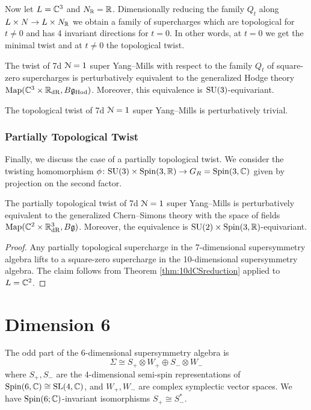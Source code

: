 \documentclass[10pt, oneside]{article}
\begin{document}
Now let $L=\mathbb C^3$ and $N_\mathbb R=\mathbb R$. Dimensionally reducing the family $Q_t$ along $L\times N\rightarrow L\times N_\mathbb R$ we obtain a family of supercharges which are topological for $t\neq 0$ and has 4 invariant directions for $t=0$. In other words, at $t=0$ we get the minimal twist and at $t\neq 0$ the topological twist.

\begin{theorem}
The twist of 7d $\mathcal N=1$ super Yang--Mills with respect to the family $Q_t$ of square-zero supercharges is perturbatively equivalent to the generalized Hodge theory $\operatorname{Map}(\mathbb C^3\times \mathbb R_{\mathrm{dR}}, B\mathfrak g_{\mathrm{Hod}})$. Moreover, this equivalence is $\mathrm{SU}(3)$-equivariant.
\label{thm:7dHodgetwist}
\end{theorem}

\begin{corollary}
The topological twist of 7d $\mathcal N=1$ super Yang--Mills is perturbatively trivial.
\end{corollary}

\subsubsection{Partially Topological Twist}
\label{sect:7dpartialtwist}

Finally, we discuss the case of a partially topological twist. We consider the twisting homomorphism $\phi\colon \mathrm{SU}(3)\times \mathrm{Spin}(3, \mathbb R)\rightarrow G_R=\mathrm{Spin}(3, \mathbb C)$ given by projection on the second factor.

\begin{theorem}
The partially topological twist of 7d $\mathcal N=1$ super Yang--Mills is perturbatively equivalent to the generalized Chern--Simons theory with the space of fields $\operatorname{Map}(\mathbb C^2\times \mathbb R^3_{\mathrm{dR}}, B\mathfrak g)$. Moreover, the equivalence is $\mathrm{SU}(2)\times \mathrm{Spin}(3, \mathbb R)$-equivariant.
\label{thm:7dpartiallytopologicaltwist}
\end{theorem}
\begin{proof}
Any partially topological supercharge in the 7-dimensional supersymmetry algebra lifts to a square-zero supercharge in the 10-dimensional supersymmetry algebra. The claim follows from Theorem \ref{thm:10dCSreduction} applied to $L=\mathbb C^2$.
\end{proof}

\section{Dimension 6}

The odd part of the $6$-dimensional supersymmetry algebra is
\[
\Sigma\cong S_+\otimes W_+\oplus S_-\otimes W_-
\] 
where $S_+, S_-$ are the 4-dimensional semi-spin representations of $\mathrm{Spin}(6 , \mathbb C)\cong \mathrm{SL}(4, \mathbb C)$, and $W_+, W_-$ are complex symplectic vector spaces. 
We have $\mathrm{Spin}(6;\mathbb C)$-invariant isomorphisms $S_+\cong S_-^*$.
\end{document}
